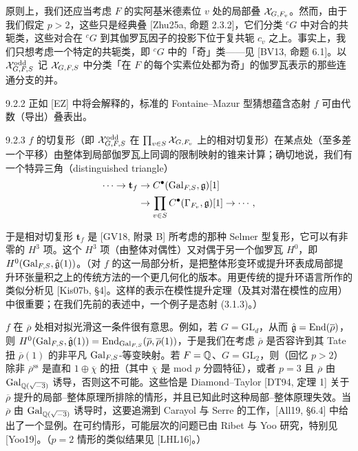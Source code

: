 原则上，我们还应当考虑 $F$ 的实阿基米德素位 $v$ 处的局部叠 $\mathcal{X}_{G,F_v}$。然而，由于我们假定 $p>2$，这些只是经典叠 [Zhu25a, 命题 2.3.2]，它们分类 ${}^cG$ 中对合的共轭类，这些对合在 ${}^cG$ 到其伽罗瓦因子的投影下位于复共轭 $c_v$ 之上。事实上，我们只想考虑一个特定的共轭类，即 ${}^cG$ 中的「奇」类——见 [BV13, 命题 6.1]。以 $\mathcal{X}^{\mathrm{odd}}_{G,F,S}$ 记 $\mathcal{X}_{G,F,S}$ 中分类「在 $F$ 的每个实素位处都为奇」的伽罗瓦表示的那些连通分支的并。

\begin{rem}{9.2.2}\label{rem:a4-9-2-2}
正如 [EZ] 中将会解释的，标准的 Fontaine--Mazur 型猜想蕴含态射 $f$ 可由代数（导出）叠表出。
\end{rem}

\begin{rem}{9.2.3}\label{rem:a4-9-2-3}
$f$ 的切复形（即 $\mathcal{X}^{\mathrm{odd}}_{G,F,S}$ 在 $\prod_{v\in S}\mathcal{X}_{G,F_v}$ 上的相对切复形）在某点处（至多差一个平移）由整体到局部伽罗瓦上同调的限制映射的锥来计算；确切地说，我们有一个特异三角（distinguished triangle）
\[
\begin{aligned}
\cdots\to\mathbf t_f&\to C^\bullet(\operatorname{Gal}_{F,S},\mathfrak g)[1]\\
&\to\prod_{v\in S}C^\bullet(\Gamma_{F_v},\mathfrak g)[1]\to\cdots,
\end{aligned}
\]
\end{rem}

于是相对切复形 $\mathbf t_f$ 是 [GV18, 附录 B] 所考虑的那种 Selmer 型复形，它可以有非零的 $H^3$ 项。这个 $H^3$ 项（由整体对偶性）又对偶于另一个伽罗瓦 $H^0$，即 $H^0(\operatorname{Gal}_{F,S},\hat{\mathfrak g}(1))$。（对 $f$ 的这一局部分析，是把整体形变环或提升环表成局部提升环张量积之上的传统方法的一个更几何化的版本。用更传统的提升环语言所作的类似分析见 [Kis07b, §4]。这样的表示在模性提升定理（及其对潜在模性的应用）中很重要；在我们先前的表述中，一个例子是态射 (3.1.3)。）

$f$ 在 $\overline{\rho}$ 处相对拟光滑这一条件很有意思。例如，若 $G=\mathrm{GL}_d$，从而 $\hat{\mathfrak g}=\operatorname{End}(\overline{\rho})$，则 $H^0(\operatorname{Gal}_{F,S},\hat{\mathfrak g}(1))=\operatorname{End}_{\operatorname{Gal}_{F,S}}(\overline{\rho},\overline{\rho}(1))$，于是我们在考虑 $\overline{\rho}$ 是否容许到其 Tate 扭 $\overline{\rho}(1)$ 的非平凡 $\operatorname{Gal}_{F,S}$-等变映射。若 $F=\mathbb{Q}$、$G=\mathrm{GL}_2$，则（回忆 $p>2$）除非 $\overline{\rho}^{\mathrm{ss}}$ 是直和 $1\oplus\overline{\chi}$ 的扭（其中 $\overline{\chi}$ 是 mod $p$ 分圆特征），或者 $p=3$ 且 $\overline{\rho}$ 由 $\operatorname{Gal}_{\mathbb{Q}(\sqrt{-3})}$ 诱导，否则这不可能。这些恰是 Diamond--Taylor [DT94, 定理 1] 关于 $\overline{\rho}$ 提升的局部--整体原理所排除的情形，并且已知此时这种局部--整体原理失效。当 $\overline{\rho}$ 由 $\operatorname{Gal}_{\mathbb{Q}(\sqrt{-3})}$ 诱导时，这要追溯到 Carayol 与 Serre 的工作，[All19, §6.4] 中给出了一个显例。在可约情形，可能层次的问题已由 Ribet 与 Yoo 研究，特别见 [Yoo19]。（$p=2$ 情形的类似结果见 [LHL16]。）

